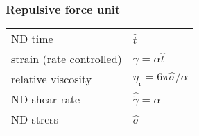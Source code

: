 \documentclass[fontsize=11pt]{scrartcl}
\begin{document}
\subsubsection*{Repulsive force unit}

\begin{center}
  \begin{tabular}{ll}
    ND time & $\hat{t}$  \\
    strain (rate controlled) &
    $\gamma = \alpha \hat{t}$ \\
    relative viscosity &
    $ \eta_{\mathrm{r}}
    = 6 \pi \hat{\sigma} /\alpha$
    \\
    ND shear rate &
    $\hat{\dot{\gamma}} = \alpha$ \\
    ND stress & $\hat{\sigma} $
  \end{tabular} 
\end{center}
\end{document}
